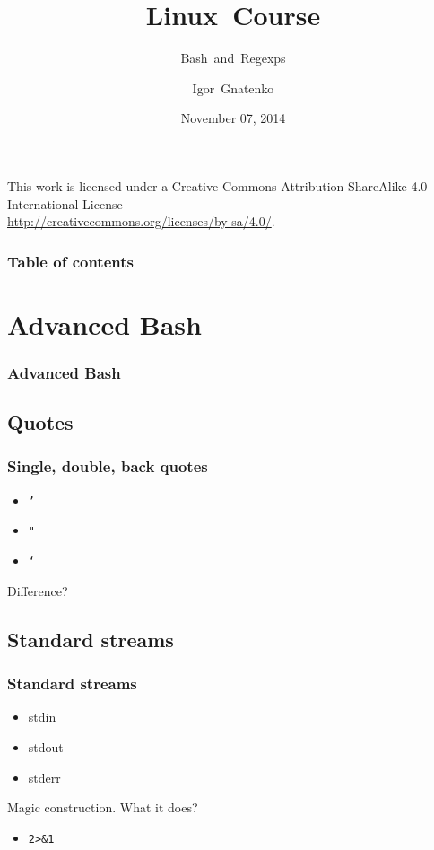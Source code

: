 \documentclass{beamer}
\title{Linux~Course}
\subtitle{Bash~and~Regexps}
\author{Igor~Gnatenko}
\date{November 07, 2014}
\begin{document}
\begin{frame}
\titlepage
\null
\vfill
\begin{flushright}
{\tiny
This work is licensed under a Creative Commons Attribution-ShareAlike 4.0
International License\\
\href{http://creativecommons.org/licenses/by-sa/4.0/}{http://creativecommons.org/licenses/by-sa/4.0/}.}
\end{flushright}
\end{frame}

\begin{frame}
\frametitle{Table of contents}
\tableofcontents
\end{frame}

\section{Advanced Bash}
\begin{frame}
\frametitle<presentation>{Advanced Bash}
\end{frame}

\subsection{Quotes}
\begin{frame}
\frametitle{Single, double, back quotes}
\begin{itemize}
  \item \texttt{'}
  \item \texttt{"}
  \item \texttt{`}
\end{itemize}
Difference?
\end{frame}

\subsection{Standard streams}
\begin{frame}
\frametitle{Standard streams}
\begin{itemize}
  \item stdin
  \item stdout
  \item stderr
\end{itemize}
\pause
Magic construction. What it does?\\
\begin{itemize}
  \item \texttt{2>\&1}
\end{itemize}
\end{frame}
\end{document}
